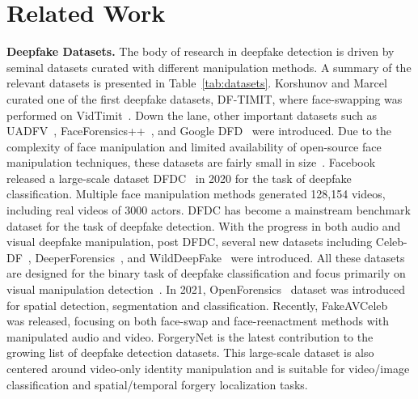 \documentclass[conference, a4paper]{IEEEtran}
\begin{document}
\section{Related Work}
\label{sec:related_work}
\noindent \textbf{Deepfake Datasets.} The body of research in deepfake detection is driven by seminal datasets curated with different manipulation methods. A summary of the relevant datasets is presented in Table~\ref{tab:datasets}. Korshunov and Marcel~\cite{korshunov_deepfakes_2018} curated one of the first deepfake datasets, DF-TIMIT, where face-swapping was performed on VidTimit~\cite{sanderson_vidtimit_2009}. Down the lane, other important datasets such as UADFV~\cite{yang_exploring_2018}, FaceForensics++~\cite{rossler_faceforensics_2019}, and Google DFD~\cite{nick_contributing_2019} were introduced. Due to the complexity of face manipulation and limited availability of open-source face manipulation techniques, these datasets are fairly small in size~\cite{li_celeb-df_2020}. Facebook released a large-scale dataset DFDC~\cite{dolhansky_deepfake_2020} in 2020 for the task of deepfake classification. Multiple face manipulation methods generated 128,154 videos, including real videos of 3000 actors. DFDC has become a mainstream benchmark dataset for the task of deepfake detection. With the progress in both audio and visual deepfake manipulation, post DFDC, several new datasets including Celeb-DF~\cite{li_celeb-df_2020}, DeeperForensics~\cite{jiang_deeperforensics-10_2020}, and WildDeepFake~\cite{zi_wilddeepfake_2020} were introduced. All these datasets are designed for the binary task of deepfake classification and focus primarily on visual manipulation detection~\cite{chugh_not_2020}. In 2021, OpenForensics~\cite{le_openforensics_2021} dataset was introduced for spatial detection, segmentation and classification. Recently, FakeAVCeleb~\cite{khalid_fakeavceleb_2021} was released, focusing on both face-swap and face-reenactment methods with manipulated audio and video. ForgeryNet\cite{he_forgerynet_2021} is the latest contribution to the growing list of deepfake detection datasets. This large-scale dataset is also centered around video-only identity manipulation and is suitable for video/image classification and spatial/temporal forgery localization tasks.
\end{document}

